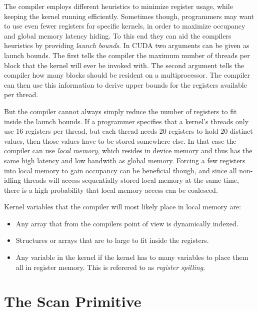 
The compiler employs different heuristics to minimize register usage,
while keeping the kernel running efficiently. Sometimes though,
programmers may want to use even fewer registers for specific kernels,
in order to maximize occupancy and global memory latency hiding. To
this end they can aid the compilers heuristics by providing
\textit{launch bounds}. In CUDA two arguments can be given as launch
bounds. The first tells the compiler the maximum number of threads per
block that the kernel will ever be invoked with. The second argument
tells the compiler how many blocks should be resident on a
multiprocessor. The compiler can then use this information to derive
upper bounds for the registers available per thread.





But the compiler cannot always simply reduce the number of registers to fit
inside the launch bounds. If a programmer specifies that a kernel's threads only
use 16 registers per thread, but each thread needs 20 registers to hold 20
distinct values, then those values have to be stored somewhere else. In that
case the compiler can use \textit{local memory}, which resides in device memory
and thus has the same high latency and low bandwith as global memory. Forcing a
few registers into local memory to gain occupancy can be beneficial though, and
since all non-idling threads will access sequentially stored local memory at the
same time, there is a high probability that local memory access can be
coalesced.

Kernel variables that the compiler will most likely place in local
memory are:

\begin{itemize}
  \item Any array that from the compilers point of view is dynamically
    indexed.
  \item Structures or arrays that are to large to fit inside the
    registers.
  \item Any variable in the kernel if the kernel has to many variables
    to place them all in register memory. This is referered to as
    \textit{register spilling}.
\end{itemize}



\section{The Scan Primitive}\label{sec:GPUprims}

